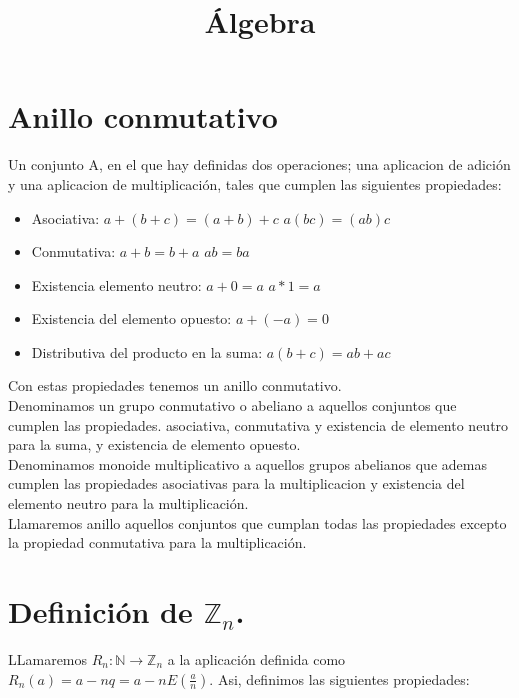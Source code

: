 \documentclass[11pt]{article}
\title{\textbf{Álgebra}}
\date{}
\begin{document}
\maketitle

\section{Anillo conmutativo}

Un conjunto A, en el que hay definidas dos operaciones; una aplicacion de adición y una aplicacion de multiplicación, tales que cumplen las siguientes propiedades:
\begin{itemize}
\item Asociativa: $a+(b+c) = (a+b)+c$\hspace{1cm} $a(bc) = (ab)c$
\item Conmutativa: $a+b = b+a$ \hspace{1cm} $ab = ba$
\item Existencia elemento neutro: $a+0 = a$ \hspace{1cm} $a*1 = a$
\item Existencia del elemento opuesto: $a+(-a) = 0$
\item Distributiva del producto en la suma: $a(b+c) = ab+ ac$

\end{itemize}

Con estas propiedades tenemos un anillo conmutativo.\\

Denominamos un grupo conmutativo o abeliano a aquellos conjuntos que cumplen las propiedades. asociativa, conmutativa y existencia de elemento neutro para la suma, y existencia de elemento opuesto.\\

Denominamos monoide multiplicativo a aquellos grupos abelianos que ademas cumplen las propiedades asociativas para la multiplicacion y existencia del elemento neutro para la multiplicación.\\

Llamaremos anillo aquellos conjuntos que cumplan todas las propiedades excepto la propiedad conmutativa para la multiplicación.\\

\section{Definición de $\mathbb{Z}_{n}$.}

LLamaremos $R_n:\mathbb{N} \rightarrow \mathbb{Z}_n$ a la aplicación definida como $R_n(a) = a - nq = a- nE(\frac{a}{n})$. Asi, definimos las siguientes propiedades:
\end{document}
